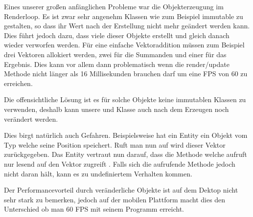 
Eines unserer großen anfänglichen Probleme war die Objekterzeugung im Renderloop. Es ist zwar sehr angenehm Klassen wie zum Beispiel  immutable  zu gestalten, so dass ihr Wert nach der Erstellung nicht mehr geändert werden kann.
Dies führt jedoch dazu, dass viele dieser Objekte erstellt und gleich danach wieder verworfen werden. Für eine einfache Vektoraddition müssen zum Beispiel drei Vektoren allokiert werden, zwei für die Summanden und einer für das Ergebnis.
Dies kann vor allem dann problematisch wenn die render/update Methode nicht länger als 16 Millisekunden brauchen darf um eine FPS von 60 zu erreichen.

Die offensichtliche Lösung ist es für solche Objekte keine immutablen Klassen zu verwenden, deshalb kann unsere  und  Klasse auch nach dem Erzeugen noch verändert werden.

Dies birgt natürlich auch Gefahren. Beispielsweise hat ein Entity ein Objekt vom Typ  welche seine Position speichert. Ruft man nun  auf wird dieser Vektor zurückgegeben. Das Entity vertraut nun darauf, dass die Methode welche  aufruft nur lesend auf den Vektor zugreift . Falls sich die aufrufende Methode jedoch nicht daran hält, kann es zu undefiniertem Verhalten kommen.

Der Performancevorteil durch veränderliche Objekte ist auf dem Dektop nicht sehr stark zu bemerken, jedoch auf der mobilen Plattform macht dies den Unterschied ob man 60 FPS mit seinem Programm erreicht.